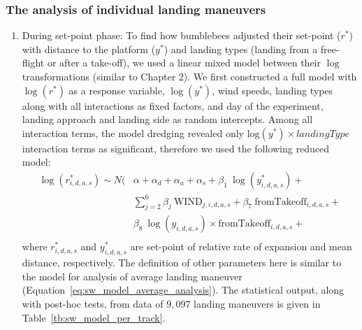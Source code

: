 \subsubsection{The analysis of individual landing maneuvers}
\begin{enumerate}
	\item During set-point phase: To find how bumblebees adjusted their set-point ($r^*$) with distance to the platform ($y^*$) and landing types (landing from a free-flight or after a take-off), we used a linear mixed model between their $\log$ transformations (similar to Chapter 2). We first constructed a full model with $\log(r^*)$ as a response variable, $\log(y^*)$, wind speeds, landing types along with all interactions as fixed factors, and day of the experiment, landing approach and landing side as random intercepts. Among all interaction terms, the model dredging revealed only $\text{log}(y^*)\times landingType$ interaction terms as significant, therefore we used the following reduced model:
	\begin{equation}
		\label{eq:sw_model_per_track}
		\begin{array}{lll}
			\log(r_{i,d,a,s}^*) \sim N(\!\!\!\!\!
			&\alpha + \alpha_d + \alpha_a + \alpha_s + \beta_1~\log(y_{i,d,a,s}^*) + \\
			&\sum_{j=2}^{6} \beta_j~\textrm{WIND}_{j,i,d,a,s} + 
			\beta_7~\textrm{fromTakeoff}_{i,d,a,s} + \\
			&\beta_8~\log(y_{i,d,a,s})\times \textrm{fromTakeoff}_{i,d,a,s} + \\
		\end{array}
	\end{equation}
	where $r_{i,d,a,s}^*$ and $y_{i,d,a,s}^*$ are set-point of relative rate of expansion and mean distance, respectively. The definition of other parameters here is similar to the model for analysis of average landing maneuver (Equation~\ref{eq:sw_model_average_analysis}). The statistical output, along with post-hoc tests, from data of $9,097$ landing maneuvers is given in Table~\ref{tb:sw_model_per_track}.
	

\end{enumerate}
